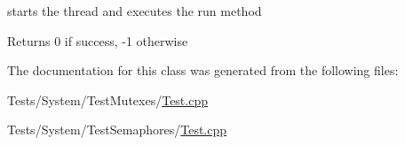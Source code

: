 starts the thread and executes the run method 

\begin{DoxyReturn}{\-Returns}
0 if success, -\/1 otherwise 
\end{DoxyReturn}


\-The documentation for this class was generated from the following files\-:\begin{DoxyCompactItemize}
\item 
\-Tests/\-System/\-Test\-Mutexes/\hyperlink{_test_mutexes_2_test_8cpp}{\-Test.\-cpp}\item 
\-Tests/\-System/\-Test\-Semaphores/\hyperlink{_test_semaphores_2_test_8cpp}{\-Test.\-cpp}\end{DoxyCompactItemize}
